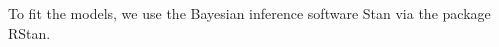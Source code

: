 To fit the models, we use the Bayesian inference software Stan \cite{stan-software:2013} via the package RStan.




